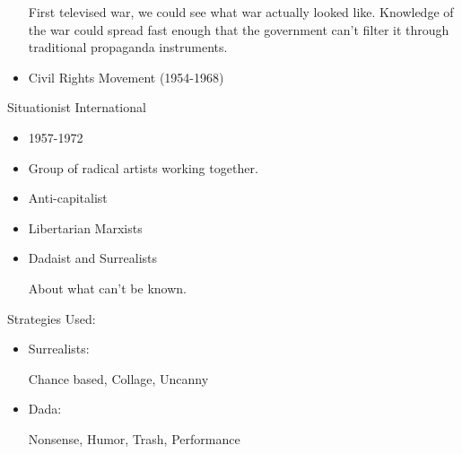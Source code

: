 \documentclass{report}
\begin{document}
\begin{description}
\begin{mdframed}
\begin{itemize}
                    \begin{mdframed}
                        First televised war,
                        we could see what war actually
                        looked like. Knowledge of the war
                        could spread fast enough that
                        the government can't filter
                        it through traditional propaganda
                        instruments.
                    \end{mdframed}
                \item Civil Rights Movement (1954-1968)
            \end{itemize}
        \end{mdframed}
    \item {\large Situationist International}
        \begin{mdframed}
            \begin{itemize}
                \item 1957-1972
                \item Group of radical artists working
                    together.
                \item Anti-capitalist
                \item Libertarian Marxists
                \item Dadaist and Surrealists
                    \begin{mdframed}
                        About what can't be known.
                    \end{mdframed}
            \end{itemize}
            Strategies Used:
            \begin{itemize}
                \item Surrealists:
                    \begin{mdframed}
                        Chance based, Collage, Uncanny
                    \end{mdframed}
                \item Dada:
                    \begin{mdframed}
                        Nonsense, Humor, Trash, Performance
                    \end{mdframed}
                    \begin{center}
\end{center}
\end{itemize}
\end{mdframed}
\end{description}
\end{document}
